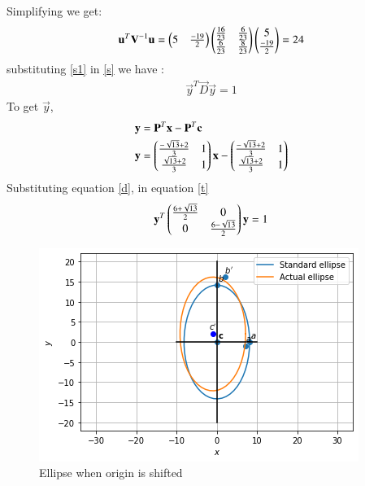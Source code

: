 \documentclass[journal,12pt,twocolumn]{IEEEtran}
\begin{document}
Simplifying we get:
\begin{align}\label{s1}
\mathbf{u}^T\mathbf{V}^{-1}\mathbf{u}=
\begin{pmatrix}
5 &\frac{-19}{2}
\end{pmatrix}
\begin{pmatrix}
\frac{16}{23} & \frac{6}{23}\\
\frac{6}{23} & \frac{8}{23}
\end{pmatrix}
\begin{pmatrix}
5\\\frac{-19}{2}
\end{pmatrix}
=24
\end{align}
substituting \eqref{s1} in \eqref{s} we have :
\begin{align}\label{t}
 \vec{y}^T\vec{D}\vec{y}=1  
\end{align}
To get $\vec{y}$,
\begin{align}
\mathbf{y}&=\mathbf{P}^T\mathbf{x}-\mathbf{P}^T\mathbf{c}\\
    \mathbf{y}&=\begin{pmatrix}\frac{-\sqrt{13}+2}{3} & 1 \\ \frac{\sqrt{13}+2}{3} & 1\end{pmatrix}
    \mathbf{x}-\begin{pmatrix}\frac{-\sqrt{13}+2}{3} & 1\\ \frac{\sqrt{13}+2}{3} & 1\end{pmatrix}
\end{align}
Substituting  equation \eqref{d}, in equation \eqref{t} 
\begin{align}
    \mathbf{y}^T \begin{pmatrix}
    \frac{6+\sqrt{13}}{2} & 0\\
     0 &\frac{6-\sqrt{13}}{2}
    \end{pmatrix}\mathbf{y}=1
\end{align}
\renewcommand{\thefigure}{1}
\begin{figure}[h]
    \centering
    \includegraphics[width=\columnwidth]{Assignment 6.png}
    \caption{Ellipse when origin is shifted}
    \label{Fig :1}
\end{figure}
\end{document}
